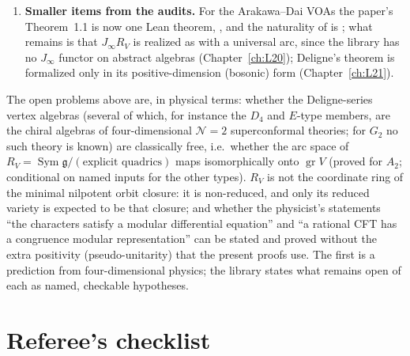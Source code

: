\begin{enumerate}
  remains open. Related missing statement: a
  single packaged theorem that the category of ordinary modules is a modular tensor category.
\item \textbf{Smaller items from the audits.} For the Arakawa--Dai VOAs the paper's Theorem~1.1 is now one Lean theorem,
  , and the naturality of  is ; what
  remains is that $J_\infty R_V$ is realized as  with a universal arc, since the library has no
  $J_\infty$ functor on abstract algebras (Chapter~\ref{ch:L20}); Deligne's theorem is formalized only in
  its positive-dimension (bosonic) form (Chapter~\ref{ch:L21}).
\end{enumerate}

\begin{physics}
The open problems above are, in physical terms: whether the Deligne-series vertex algebras (several of which, for
instance the $D_4$ and $E$-type members, are the chiral algebras of four-dimensional $\mathcal N=2$ superconformal
theories; for $G_2$ no such theory is known) are classically free, i.e.\ whether the arc space of
$R_V=\operatorname{Sym}\mathfrak g/(\text{explicit quadrics})$ maps isomorphically onto $\operatorname{gr}V$ (proved for
$A_2$; conditional on named inputs for the other types). $R_V$ is not the coordinate ring of the minimal nilpotent orbit
closure: it is non-reduced, and only its reduced variety is expected to be that closure; and whether the physicist's statements ``the
characters satisfy a modular differential equation'' and ``a rational CFT has a congruence modular representation'' can be
stated and proved without the extra positivity (pseudo-unitarity) that the present proofs use. The first is a
prediction from four-dimensional physics; the library states what remains open of each as named, checkable hypotheses.
\end{physics}

\section{Referee's checklist}\label{ch15:sec:checklist}

